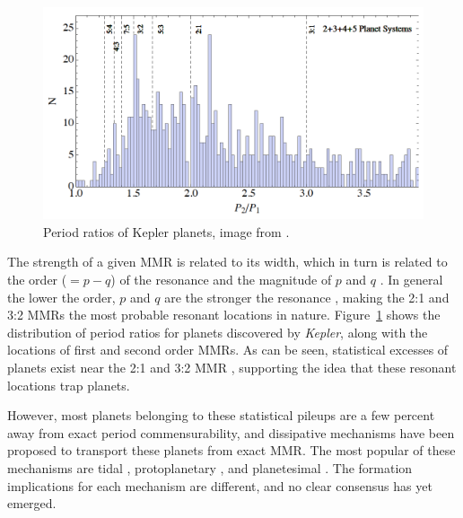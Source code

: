 \documentclass[12pt,letter]{aastex}
\newcommand{\kep}{{\it Kepler}\xspace}
\begin{document}
\begin{figure}
\centering
\includegraphics[width=1.00\textwidth]{Figures/KeplerPeriods.png}
\caption{
\footnotesize Period ratios of Kepler planets, image from \citet{Goldreich2014}.}
\label{fig:KepMMR}
\end{figure}

The strength of a given MMR is related to its width, which in turn is related to the order ($= p - q$) of the resonance and the magnitude of $p$ and $q$ \citep{SSD1999}. 
In general the lower the order, $p$ and $q$ are the stronger the resonance \citep{SSD1999}, making the 2:1 and 3:2 MMRs the most probable resonant locations in nature. 
Figure~\ref{fig:KepMMR} shows the distribution of period ratios for planets discovered by \kep, along with the locations of first and second order MMRs. 
As can be seen, statistical excesses of planets exist near the 2:1 and 3:2 MMR \citep{Lissauer2011,Fabrycky2014,Steffen2015}, supporting the idea that these resonant locations trap planets.

However, most planets belonging to these statistical pileups are a few percent away from exact period commensurability, and dissipative mechanisms have been proposed to transport these planets from exact MMR. 
The most popular of these mechanisms are tidal \citep{LithwickWu2012, Batygin2013, Delisle2014}, protoplanetary \citep{Rein2012b, Baruteau2013, Goldreich2014}, and planetesimal \citep{Moore2013, Chatterjee2015}. 
The formation implications for each mechanism are different, and no clear consensus has yet emerged.

\end{document}
